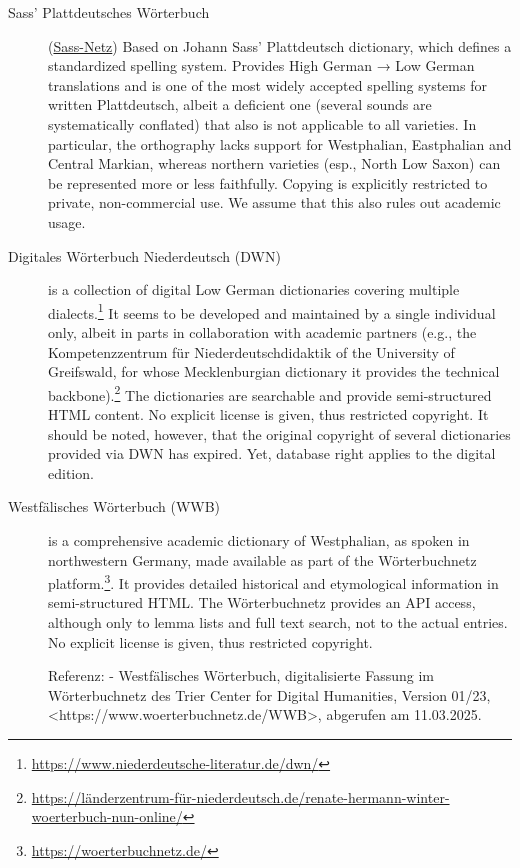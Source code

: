 \documentclass{article}
\begin{document}
\begin{description}
\item[Sass’ Plattdeutsches Wörterbuch] (\href{https://netz.sass-platt.de/hoch-platt}{Sass-Netz})  
    Based on Johann Sass' Plattdeutsch dictionary, which defines a standardized spelling system. Provides High German → Low German translations and is one of the most widely accepted spelling systems for written Plattdeutsch, albeit a deficient one (several sounds are systematically conflated) that also is not applicable to all varieties. In particular, the orthography lacks support for Westphalian, Eastphalian and Central Markian, whereas northern varieties (esp., North Low Saxon) can be represented more or less faithfully. Copying is explicitly restricted to private, non-commercial use. We assume that this also rules out academic usage.

\item[Digitales Wörterbuch Niederdeutsch (DWN)] is a collection of digital Low German dictionaries covering multiple dialects.\footnote{\url{https://www.niederdeutsche-literatur.de/dwn/}} It seems to be developed and maintained by a single individual only, albeit in parts in collaboration with academic partners (e.g., the Kompetenzzentrum für Niederdeutschdidaktik of the University of Greifswald, for whose Mecklenburgian dictionary it provides the technical backbone).\footnote{\url{https://länderzentrum-für-niederdeutsch.de/renate-hermann-winter-woerterbuch-nun-online/}} The dictionaries are searchable and provide semi-structured HTML content. No explicit license is given, thus restricted copyright. It should be noted, however, that the original copyright of several dictionaries provided via DWN has expired. Yet, database right applies to the digital edition. 

\item[Westfälisches Wörterbuch (WWB)] is a comprehensive academic dictionary of Westphalian, as spoken in northwestern Germany, made available as part of the Wörterbuchnetz platform.\footnote{\url{https://woerterbuchnetz.de/}}. It provides detailed historical and etymological information in semi-structured HTML. The Wörterbuchnetz provides an API access, although only to lemma lists and full text search, not to the actual entries. No explicit license is given, thus restricted copyright.

Referenz:
- Westfälisches Wörterbuch, digitalisierte Fassung im Wörterbuchnetz des Trier Center for Digital Humanities, Version 01/23, <https://www.woerterbuchnetz.de/WWB>, abgerufen am 11.03.2025.



\end{description}
\end{document}
